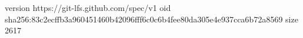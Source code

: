 version https://git-lfs.github.com/spec/v1
oid sha256:83c2ecffb3a960451460b42096fff6c0c6b4fee80da305e4e937cca6b72a8569
size 2617
